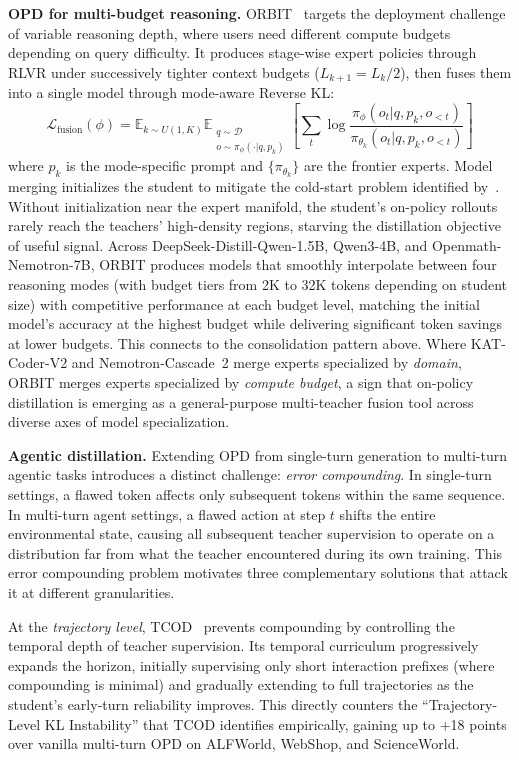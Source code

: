 \documentclass{article} %
\newcommand{\E}{\mathbb{E}}
\newcommand{\loss}{\mathcal{L}}
\begin{document}
\textbf{OPD for multi-budget reasoning.} ORBIT~\citep{2601.08310} targets the deployment challenge of variable reasoning depth, where users need different compute budgets depending on query difficulty. It produces stage-wise expert policies through RLVR under successively tighter context budgets ($L_{k+1} = L_k/2$), then fuses them into a single model through mode-aware Reverse KL:
\begin{equation*}
    \loss_{\text{fusion}}(\phi) = \E_{k \sim U(1,K)} \E_{\substack{q \sim \mathcal{D} \\ o \sim \pi_\phi(\cdot|q, p_k)}} \left[ \sum_t \log \frac{\pi_\phi(o_t | q, p_k, o_{<t})}{\pi_{\theta_k}(o_t | q, p_k, o_{<t})} \right]
\end{equation*}
where $p_k$ is the mode-specific prompt and $\{\pi_{\theta_k}\}$ are the frontier experts. Model merging initializes the student to mitigate the cold-start problem identified by~\citet{2601.07155}. Without initialization near the expert manifold, the student's on-policy rollouts rarely reach the teachers' high-density regions, starving the distillation objective of useful signal. Across DeepSeek-Distill-Qwen-1.5B, Qwen3-4B, and Openmath-Nemotron-7B, ORBIT produces models that smoothly interpolate between four reasoning modes (with budget tiers from 2K to 32K tokens depending on student size) with competitive performance at each budget level, matching the initial model's accuracy at the highest budget while delivering significant token savings at lower budgets. This connects to the consolidation pattern above. Where KAT-Coder-V2 and Nemotron-Cascade~2 merge experts specialized by \emph{domain}, ORBIT merges experts specialized by \emph{compute budget}, a sign that on-policy distillation is emerging as a general-purpose multi-teacher fusion tool across diverse axes of model specialization.

\textbf{Agentic distillation.} Extending OPD from single-turn generation to multi-turn agentic tasks introduces a distinct challenge: \emph{error compounding}. In single-turn settings, a flawed token affects only subsequent tokens within the same sequence. In multi-turn agent settings, a flawed action at step $t$ shifts the entire environmental state, causing all subsequent teacher supervision to operate on a distribution far from what the teacher encountered during its own training. This error compounding problem motivates three complementary solutions that attack it at different granularities.

At the \emph{trajectory level}, TCOD~\citep{2604.24005} prevents compounding by controlling the temporal depth of teacher supervision. Its temporal curriculum progressively expands the horizon, initially supervising only short interaction prefixes (where compounding is minimal) and gradually extending to full trajectories as the student's early-turn reliability improves. This directly counters the ``Trajectory-Level KL Instability'' that TCOD identifies empirically, gaining up to +18 points over vanilla multi-turn OPD on ALFWorld, WebShop, and ScienceWorld.
\end{document}
